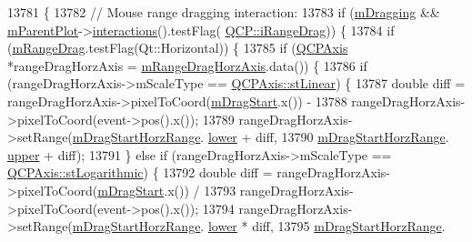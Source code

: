 \begin{DoxyCode}
13781                                                    \{
13782   \textcolor{comment}{// Mouse range dragging interaction:}
13783   \textcolor{keywordflow}{if} (\hyperlink{class_q_c_p_axis_rect_ab49a6698194cf0e9e38a1d734c0888a8}{mDragging} && \hyperlink{class_q_c_p_layerable_aa2a528433e44db02b8aef23c1f9f90ed}{mParentPlot}->\hyperlink{class_q_custom_plot_a12401c02b6949a717f5749bb28c62983}{interactions}().testFlag(
      \hyperlink{namespace_q_c_p_a2ad6bb6281c7c2d593d4277b44c2b037a2c4432b9aceafb94000be8d1b589ef18}{QCP::iRangeDrag})) \{
13784     \textcolor{keywordflow}{if} (\hyperlink{class_q_c_p_axis_rect_aa9f107f66ca3469ad50ee6cea7c9e237}{mRangeDrag}.testFlag(Qt::Horizontal)) \{
13785       \textcolor{keywordflow}{if} (\hyperlink{class_q_c_p_axis}{QCPAxis} *rangeDragHorzAxis = \hyperlink{class_q_c_p_axis_rect_aeaaa38c6d2030dd5f84461e2596e41e3}{mRangeDragHorzAxis}.data()) \{
13786         \textcolor{keywordflow}{if} (rangeDragHorzAxis->mScaleType == \hyperlink{class_q_c_p_axis_a36d8e8658dbaa179bf2aeb973db2d6f0aff6e30a11a828bc850caffab0ff994f6}{QCPAxis::stLinear}) \{
13787           \textcolor{keywordtype}{double} diff = rangeDragHorzAxis->pixelToCoord(\hyperlink{class_q_c_p_axis_rect_a032896b28f83a58010d8d533b78c49df}{mDragStart}.x()) -
13788                         rangeDragHorzAxis->pixelToCoord(event->pos().x());
13789           rangeDragHorzAxis->setRange(\hyperlink{class_q_c_p_axis_rect_a41936cf473ec638bec382f5a40cdb1f3}{mDragStartHorzRange}.
      \hyperlink{class_q_c_p_range_aa3aca3edb14f7ca0c85d912647b91745}{lower} + diff,
13790                                       \hyperlink{class_q_c_p_axis_rect_a41936cf473ec638bec382f5a40cdb1f3}{mDragStartHorzRange}.
      \hyperlink{class_q_c_p_range_ae44eb3aafe1d0e2ed34b499b6d2e074f}{upper} + diff);
13791         \} \textcolor{keywordflow}{else} \textcolor{keywordflow}{if} (rangeDragHorzAxis->mScaleType == \hyperlink{class_q_c_p_axis_a36d8e8658dbaa179bf2aeb973db2d6f0abf5b785ad976618816dc6f79b73216d4}{QCPAxis::stLogarithmic}) \{
13792           \textcolor{keywordtype}{double} diff = rangeDragHorzAxis->pixelToCoord(\hyperlink{class_q_c_p_axis_rect_a032896b28f83a58010d8d533b78c49df}{mDragStart}.x()) /
13793                         rangeDragHorzAxis->pixelToCoord(event->pos().x());
13794           rangeDragHorzAxis->setRange(\hyperlink{class_q_c_p_axis_rect_a41936cf473ec638bec382f5a40cdb1f3}{mDragStartHorzRange}.
      \hyperlink{class_q_c_p_range_aa3aca3edb14f7ca0c85d912647b91745}{lower} * diff,
13795                                       \hyperlink{class_q_c_p_axis_rect_a41936cf473ec638bec382f5a40cdb1f3}{mDragStartHorzRange}.

\end{DoxyCode}
